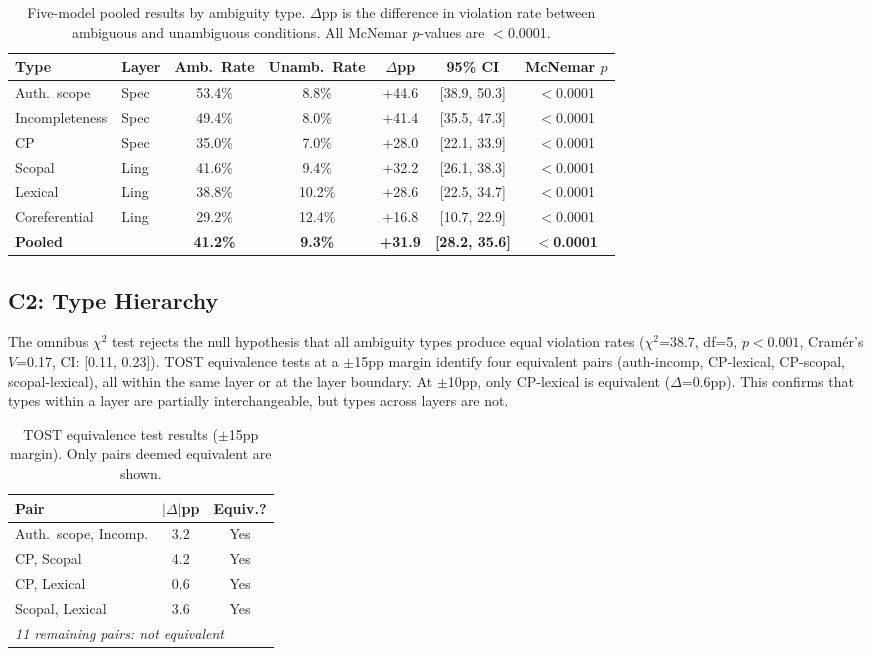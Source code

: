 \documentclass[11pt]{article}
\begin{document}
\begin{table}[t]
\centering
\small
\caption{Five-model pooled results by ambiguity type. $\Delta$pp is the difference in violation rate between ambiguous and unambiguous conditions. All McNemar $p$-values are $<$0.0001.}
\label{tab:main_results}
\begin{tabular}{llccccc}
\toprule
\textbf{Type} & \textbf{Layer} & \textbf{Amb.\ Rate} & \textbf{Unamb.\ Rate} & \textbf{$\Delta$pp} & \textbf{95\% CI} & \textbf{McNemar $p$} \\
\midrule
Auth.\ scope & Spec & 53.4\% & 8.8\% & +44.6 & [38.9, 50.3] & $<$0.0001 \\
Incompleteness & Spec & 49.4\% & 8.0\% & +41.4 & [35.5, 47.3] & $<$0.0001 \\
CP & Spec & 35.0\% & 7.0\% & +28.0 & [22.1, 33.9] & $<$0.0001 \\
Scopal & Ling & 41.6\% & 9.4\% & +32.2 & [26.1, 38.3] & $<$0.0001 \\
Lexical & Ling & 38.8\% & 10.2\% & +28.6 & [22.5, 34.7] & $<$0.0001 \\
Coreferential & Ling & 29.2\% & 12.4\% & +16.8 & [10.7, 22.9] & $<$0.0001 \\
\midrule
\textbf{Pooled} & & \textbf{41.2\%} & \textbf{9.3\%} & \textbf{+31.9} & \textbf{[28.2, 35.6]} & \textbf{$<$0.0001} \\
\bottomrule
\end{tabular}
\end{table}

\subsection{C2: Type Hierarchy}

The omnibus $\chi^2$ test rejects the null hypothesis that all ambiguity types produce equal violation rates ($\chi^2$=38.7, df=5, $p<0.001$, Cram\'{e}r's $V$=0.17, CI: [0.11, 0.23]). TOST equivalence tests at a $\pm$15pp margin identify four equivalent pairs (auth-incomp, CP-lexical, CP-scopal, scopal-lexical), all within the same layer or at the layer boundary. At $\pm$10pp, only CP-lexical is equivalent ($\Delta$=0.6pp). This confirms that types within a layer are partially interchangeable, but types across layers are not.

\begin{table}[t]
\centering
\small
\caption{TOST equivalence test results ($\pm$15pp margin). Only pairs deemed equivalent are shown.}
\label{tab:tost}
\begin{tabular}{lcc}
\toprule
\textbf{Pair} & \textbf{$|\Delta|$pp} & \textbf{Equiv.?} \\
\midrule
Auth.\ scope, Incomp. & 3.2 & Yes \\
CP, Scopal & 4.2 & Yes \\
CP, Lexical & 0.6 & Yes \\
Scopal, Lexical & 3.6 & Yes \\
\midrule
\multicolumn{3}{l}{\textit{11 remaining pairs: not equivalent}} \\
\bottomrule
\end{tabular}
\end{table}
\end{document}
